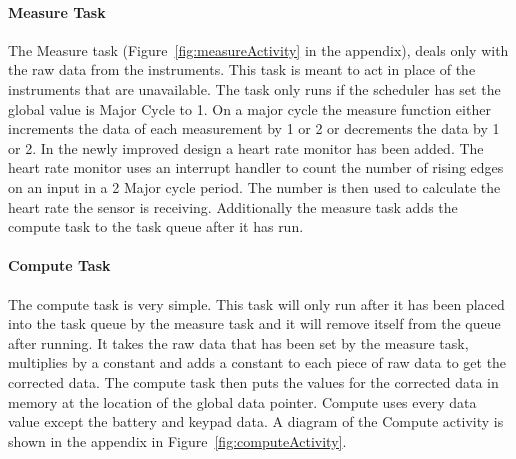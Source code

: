 \documentclass[12pt]{article} %
\begin{document}
    \paragraph{Measure Task}
    The Measure task (Figure~\ref{fig:measureActivity} in the
    appendix), deals only with the raw data from the instruments. This task is
    meant to act in place of the instruments that are unavailable. The task only
    runs if the scheduler has set the global value is Major Cycle to 1. On a major
    cycle the measure function either increments the data of each measurement by 1
    or 2 or decrements the data by 1 or 2. In the newly improved design a heart rate monitor has been added. The heart rate monitor uses an interrupt handler to count the number of rising edges on an input in a 2 Major cycle period. The number is then used to calculate the heart rate the sensor is receiving. Additionally the measure task adds the compute task to the task queue after it has run.

    \paragraph{Compute Task}
    The compute task is very simple. This task will only run after it has been placed into the task queue by the measure task and it will remove itself from the queue after running. It takes the raw data that has been set by the measure task, multiplies
    by a constant and adds a constant to each piece of raw data to get the
    corrected data. The compute task then puts the values for the corrected data in
    memory at the location of the global data pointer. Compute uses every data
    value except the battery and keypad data. A diagram of the Compute activity is shown in the appendix in Figure~\ref{fig:computeActivity}.
\end{document}

